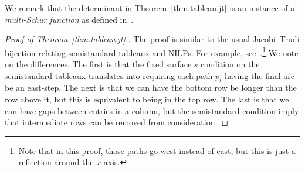 \documentclass[reqno]{amsart}
\newcommand{\0}{\phantom{c}}
\newenvironment{vershort}{}{}
\newcommand{\defn}[1]{{\color{darkred}\emph{#1}}} %
\theoremstyle{plain}
\theoremstyle{definition}
\numberwithin{equation}{section}
\begin{document}
We remark that the determinant in Theorem~\ref{thm.tableau.jt} is an instance of a \defn{multi-Schur function} as defined in~\cite[(SCHUR.2.2)]{LLPT18}.

\begin{vershort}
\begin{proof}[Proof of Theorem~\ref{thm.tableau.jt}.]
The proof is similar to the usual Jacobi--Trudi bijection relating semistandard tableaux and NILPs.
For example, see~\cite[First proof of Thm. 7.16.1]{Stanley-EC2}.\footnote{Note that in this proof, those paths go west instead of east, but this is just a reflection around the $x$-axis.}
We note on the differences.
The first is that the fixed surface $s$ condition on the semistandard tableaux translates into requiring each path $p_i$ having the final arc be an east-step.
The next is that we can have the bottom row be longer than the row above it, but this is equivalent to being in the top row.
The last is that we can have gaps between entries in a column, but the semistandard condition imply that intermediate rows can be removed from consideration.
\end{proof}
\end{vershort}
\end{document}
